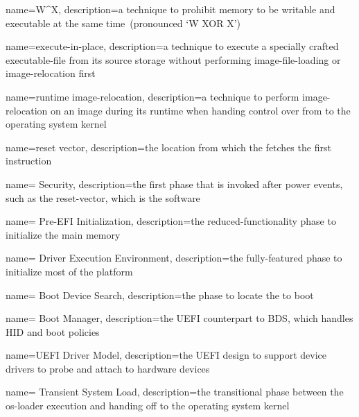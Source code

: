 {
  name={W\^{}X},
  description={a technique to prohibit memory to be writable and executable at the same time~(pronounced `W XOR X')}
}

{
  name={execute-in-place},
  description={a technique to execute a specially crafted \gls{executable-file} from its source storage without performing \gls{image-file-loading} or \gls{image-relocation} first}
}

{
  name={runtime \gls{image-relocation}},
  description={a technique to perform \gls{image-relocation} on an \gls{image} during its runtime when handing control over from  to the operating system kernel}
}

{
  name={reset vector},
  description={the location from which the  fetches the first instruction}
}

{
  name={ Security},
  description={the first  phase that is invoked after power events, such as the \gls{reset-vector}, which is the software }
}

{
  name={ Pre-EFI Initialization},
  description={the reduced-functionality  phase to initialize the main memory}
}

{
  name={ Driver Execution Environment},
  description={the fully-featured  phase to initialize most of the platform}
}

{
  name={ Boot Device Search},
  description={the  phase to locate the  to boot}
}

{
  name={ Boot Manager},
  description={the \gls{UEFI} counterpart to \gls{BDS}, which handles \gls{HID} and boot policies}
}

{
  name={\gls{UEFI} Driver Model},
  description={the \gls{UEFI} design to support device drivers to probe and attach to hardware devices}
}

{
  name={ Transient System Load},
  description={the  transitional phase between the \gls{os-loader} execution and handing off to the operating system kernel}
}

